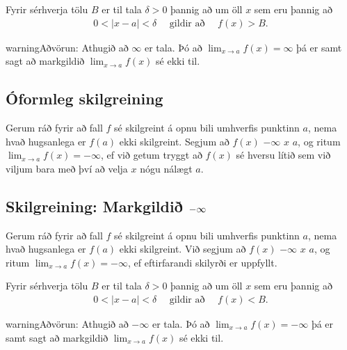 \documentclass[b5paper,10pt,icelandic]{sphinxmanual}
\begin{document}
Fyrir sérhverja tölu \(B\) er til tala \(\delta>0\) þannig
að um öll \(x\) sem eru þannig að
\begin{equation*}
\begin{split}0 < |x-a| <\delta \quad  \text{ gildir að } \quad f(x) > B.\end{split}
\end{equation*}
\begin{sphinxadmonition}{warning}{Aðvörun:}
Athugið að \(\infty\) er  tala. Þó að
\(\lim_{x\rightarrow a} f(x)=\infty\) þá er samt sagt að markgildið
\(\lim_{x\rightarrow a} f(x)\) sé ekki til.
\end{sphinxadmonition}


\subsection{Óformleg skilgreining}
\label{\detokenize{kafli02:id9}}
Gerum ráð fyrir að fall \(f\) sé skilgreint á opnu bili umhverfis
punktinn \(a\), nema hvað hugsanlega er \(f(a)\) ekki
skilgreint. Segjum að \(f(x)\)  \(-\infty\) 
\(x\)  \(a\), og ritum
\(\lim_{x\rightarrow a} f(x)=-\infty\), ef við getum tryggt að
\(f(x)\) sé hversu lítið sem við viljum bara með því að velja
\(x\) nógu nálægt \(a\).


\subsection{Skilgreining: Markgildið \protect\(-\infty\protect\)}
\label{\detokenize{kafli02:id10}}
Gerum ráð fyrir að fall \(f\) sé skilgreint á opnu bili umhverfis
punktinn \(a\), nema hvað hugsanlega er \(f(a)\) ekki
skilgreint. Við segjum að \(f(x)\)  \(-\infty\)
 \(x\)  \(a\), og ritum
\(\lim_{x\rightarrow a} f(x)=-\infty\), ef eftirfarandi skilyrði er
uppfyllt.

Fyrir sérhverja tölu \(B\) er til tala \(\delta>0\) þannig
að um öll \(x\) sem eru þannig að
\begin{equation*}
\begin{split}0 < |x-a| < \delta \quad \text{ gildir að } \quad f(x)<B.\end{split}
\end{equation*}
\begin{sphinxadmonition}{warning}{Aðvörun:}
Athugið að \(-\infty\) er  tala. Þó að
\(\lim_{x\rightarrow a} f(x)=-\infty\) þá er samt sagt að markgildið
\(\lim_{x\rightarrow a} f(x)\) sé ekki til.
\end{sphinxadmonition}
\end{document}
